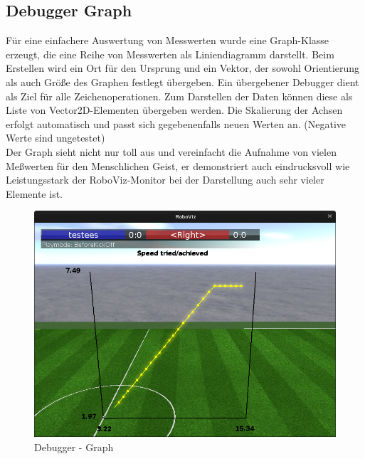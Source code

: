 \subsection{Debugger Graph}
\label{subsec:Debugger Graph}
Für eine einfachere Auswertung von Messwerten wurde eine Graph-Klasse erzeugt, die eine Reihe von Messwerten als Liniendiagramm darstellt. Beim Erstellen wird ein Ort für den Ursprung und ein Vektor, der sowohl Orientierung als auch Größe des Graphen festlegt übergeben. Ein übergebener Debugger dient als Ziel für alle Zeichenoperationen. Zum Darstellen der Daten können diese als Liste von Vector2D-Elementen übergeben werden. Die Skalierung der Achsen erfolgt automatisch und passt sich gegebenenfalls neuen Werten an. (Negative Werte sind ungetestet)\\
Der Graph sieht nicht nur toll aus und vereinfacht die Aufnahme von vielen Meßwerten für den Menschlichen Geist, er demonstriert auch eindrucksvoll wie Leistungsstark der RoboViz-Monitor bei der Darstellung auch sehr vieler Elemente ist.

\begin{figure}[H]
	\centering
	\includegraphics[width=\ScaleIfNeeded]{Grafiken/RoboViz/Graph}
	\caption{Debugger - Graph}
	\label{fig:debugger-graph}
\end{figure}